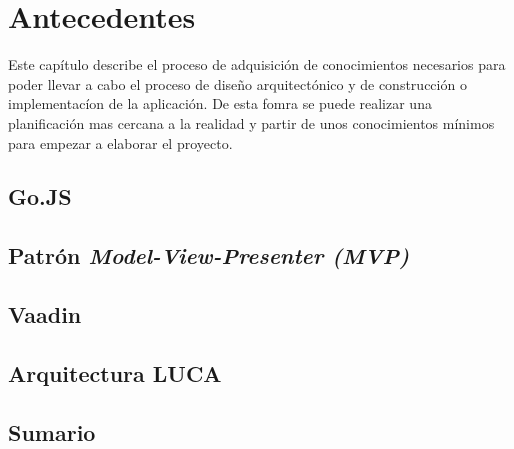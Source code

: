  \chapter{Antecedentes}

Este capítulo describe el proceso de adquisición de conocimientos necesarios para poder llevar a cabo el proceso de diseño arquitectónico y de construcción o implementacíon de la aplicación. De esta fomra se puede realizar una planificación mas cercana a la realidad y partir de unos conocimientos mínimos para empezar a elaborar el proyecto.
	
\minitoc
	
\section{Go.JS}



\section{Patrón \emph{Model-View-Presenter (MVP)}}
\label{sec:mvp}



\section{Vaadin}
 		

 			
\section{Arquitectura LUCA}

	

\section{Sumario}

	
	

	
	